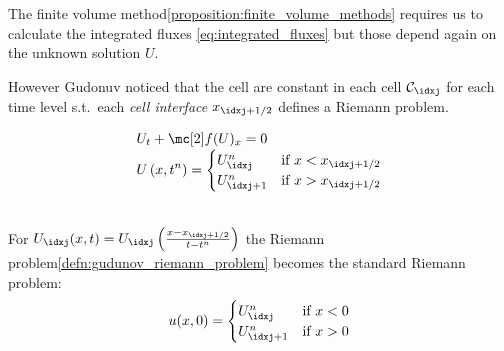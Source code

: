 \begin{sectionbox}[Problem]\nospacing
    The finite volume method\cref{proposition:finite_volume_methods} requires us to calculate the integrated fluxes \cref{eq:integrated_fluxes}
    but those depend again on the unknown solution $U$.\\
    \begin{minipage}{0.45\textwidth}
      However Gudonuv noticed that the cell  are constant in each cell $\mathcal{C}_{\idxj}$ for each time level s.t.\ each \textit{cell interface}
      $x_{\idxj+1/2}$ defines a Riemann problem.
    \end{minipage}\hfill
    \begin{minipage}[c]{0.5\textwidth}
        \begin{figure}[H]
            \centering{
              \def\svgwidth{120pt}
              \resizebox{\linewidth}{!}{}
            }
        \end{figure}
    \end{minipage}
\end{sectionbox}
\begin{defnbox}\nospacing
    \begin{defn}\label{defn:gudunov_riemann_problem}
        \begin{align}
          &U_{t}+\flux(U)_{x}=0 \\[-1\jot]
          &U\left(x,t^{n}\right)=
          \begin{cases}
              U_{\idxj}^{n}&\text{if }x<x_{\idxj+1/2}\\
              U_{\idxj+1}^{n}&\text{if }x>x_{\idxj+1/2}\\
          \end{cases}\label{eq:gudunov_riemann_problem}
        \end{align}
    \end{defn}
\end{defnbox}
\begin{corbox}\nospacing
    \begin{cor}\label{cor:scaled_gudunov_riemann_problem}\leavevmode\\
        For $U_{\idxj}(x,t)=U_{\idxj}\left(\frac{x-x_{\idxj+1/2}}{t-t^{n}}\right)$ the Riemann problem\cref{defn:gudunov_riemann_problem} becomes the standard Riemann problem:
        \begin{align}
            u(x,0)=\begin{cases}
                    U_{\idxj}^{n}&\text{if }x<0\\
                    U_{\idxj+1}^{n}&\text{if }x>0
                    \end{cases}
        \label{eq:riemann_problem_gudunov}
        \end{align}
    \end{cor}
\end{corbox}
